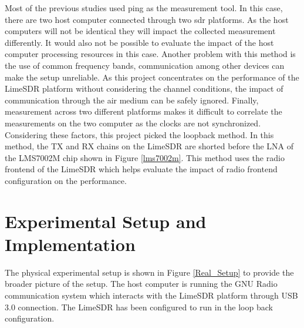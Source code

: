Most of the previous studies used ping as the measurement tool.
In this case, there are two host computer connected through two \ac{sdr} platforms.
As the host computers will not be identical they will impact the collected measurement differently.
It would also not be possible to evaluate the impact of the host computer processing resources in this case.
Another problem with this method is the use of common frequency bands, communication among other devices can make the setup unreliable.
As this project concentrates on the performance of the LimeSDR platform without considering the channel conditions, the impact of communication through the air medium can be safely ignored.
Finally, measurement across two different platforms makes it difficult to correlate the measurements on the two computer as the clocks are not synchronized.
Considering these factors, this project picked the loopback method.
In this method, the TX and RX chains on the LimeSDR are shorted before the \ac{LNA} of the LMS7002M chip shown in Figure \ref{lms7002m}.
This method uses the radio frontend of the LimeSDR which helps evaluate the impact of radio frontend configuration on the performance.




\section{Experimental Setup and Implementation}
The physical experimental setup is shown in Figure \ref{Real_Setup} to provide the broader picture of the setup.
The host computer is running the GNU Radio communication system which interacts with the LimeSDR platform through \ac{USB} 3.0 connection.
The LimeSDR has been configured to run in the loop back configuration.\\

